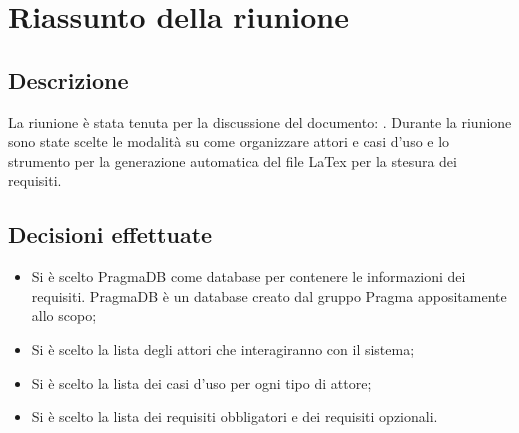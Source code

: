 \section{Riassunto della riunione}
\subsection{Descrizione}

La riunione è stata tenuta per la discussione del documento: \AdR. Durante la riunione sono state scelte le modalità su come organizzare attori e casi d'uso e lo strumento per la generazione automatica del file LaTex per la stesura dei requisiti.

\subsection{Decisioni effettuate}
\begin{itemize}
\item Si è scelto PragmaDB come database per contenere le informazioni dei requisiti. PragmaDB è un database creato dal gruppo Pragma appositamente allo scopo;
\item Si è scelto la lista degli attori che interagiranno con il sistema;
\item Si è scelto la lista dei casi d'uso per ogni tipo di attore;
\item Si è scelto la lista dei requisiti obbligatori e dei requisiti opzionali.
\end{itemize}